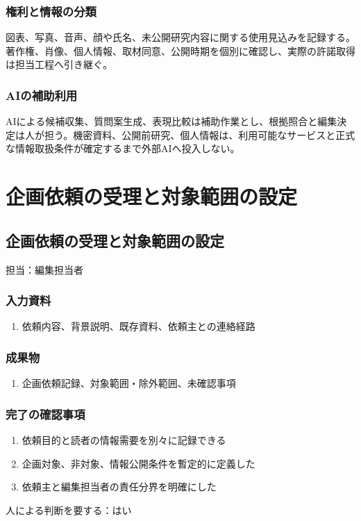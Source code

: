 \documentclass[a4paper,11pt]{article}
\begin{document}
\subsubsection{権利と情報の分類}
\par 図表、写真、音声、顔や氏名、未公開研究内容に関する使用見込みを記録する。著作権、肖像、個人情報、取材同意、公開時期を個別に確認し、実際の許諾取得は担当工程へ引き継ぐ。\par\medskip
\subsubsection{AIの補助利用}
\par AIによる候補収集、質問案生成、表現比較は補助作業とし、根拠照合と編集決定は人が担う。機密資料、公開前研究、個人情報は、利用可能なサービスと正式な情報取扱条件が確定するまで外部AIへ投入しない。\par\medskip
\section{企画依頼の受理と対象範囲の設定}
\subsection{企画依頼の受理と対象範囲の設定}
\par 担当：編集担当者\par\medskip
\subsubsection*{入力資料}
\begin{enumerate}[leftmargin=2em,itemsep=0.35em]
\item 依頼内容、背景説明、既存資料、依頼主との連絡経路
\end{enumerate}
\subsubsection*{成果物}
\begin{enumerate}[leftmargin=2em,itemsep=0.35em]
\item 企画依頼記録、対象範囲・除外範囲、未確認事項
\end{enumerate}
\subsubsection*{完了の確認事項}
\begin{enumerate}[leftmargin=2em,itemsep=0.35em]
\item 依頼目的と読者の情報需要を別々に記録できる
\item 企画対象、非対象、情報公開条件を暫定的に定義した
\item 依頼主と編集担当者の責任分界を明確にした
\end{enumerate}
\par 人による判断を要する：はい\par\medskip
\end{document}
